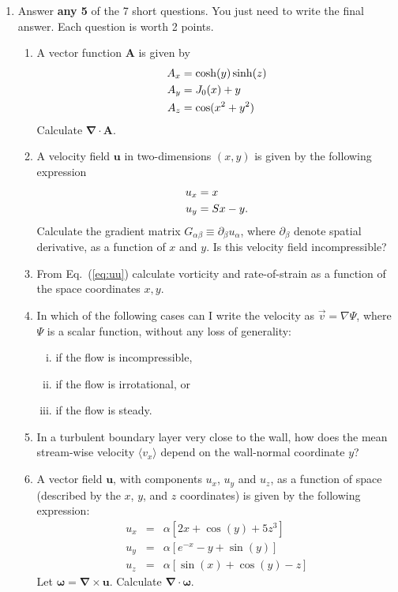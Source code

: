 \documentclass[12pt,a4paper]{article}
\def \AA  {\bm{A}}
\def \oo {\bm{\omega}}
\def \curl {\bm{\nabla}\times}
\def \dive {\bm{\nabla}\cdot}
\def \AA  {\bm{A}}
\newcommand{\bu}{\bm{u}}
\begin{document}
\begin{enumerate}
\item
\label{prb3}
Answer \textbf{any 5} of the  7 short questions.
You just need to write the final answer.
Each question is worth 2 points. 
\begin{enumerate}
\item A vector function $\AA$ is given by
  \begin{subequations}
    \begin{align}
      A_x &= \cosh(y)\sinh(z) \\
      A_y &= J_{\rm 0}(x) + y \\
      A_z &= \cos(x^2+y^2)
    \end{align}
  \end{subequations}
  Calculate $\bm{\nabla}\cdot\AA$.
 \item A velocity field $\bu$ in two-dimensions $(x,y)$ is given by the following expression
   \begin{subequations}
     \begin{align}
     u_x &= x \\
     u_y &= Sx -y   \/.
     \end{align}
     \label{eq:uu}
   \end{subequations}
   Calculate the gradient matrix $ G_{\alpha\beta} \equiv \partial_{\beta}u_{\alpha}$, where
   $\partial_{\beta}$ denote spatial derivative, as a function of $x$ and $y$. Is this velocity
   field incompressible?
 \item From Eq.~(\ref{eq:uu})  calculate vorticity and rate-of-strain as a function of the
   space coordinates $x,y$.

  \item In which of the following cases can I write the velocity as $\vec{v} = \nabla \Psi$, 
  where $\Psi$ is a scalar function, without any loss of generality:
    \begin{enumerate}[(i)]
    \item  if the flow is incompressible,
    \item if the flow is irrotational, or
    \item if the flow is steady.
    \end{enumerate}
  \item In a turbulent boundary layer very close to the wall, how does the mean stream-wise
    velocity $\langle v_x \rangle$ depend on the wall-normal coordinate $y$? 

\item A vector field $\bu$, with components $u_x$, $u_y$ and $u_z$,  as a function  of
    space (described by the $x$, $y$, and $z$ coordinates)
    is given by the following expression:
    \begin{eqnarray}
      u_x &=& \alpha [2x + \cos(y) + 5z^3 ] \nonumber \\
      u_y &=& \alpha[ e^{-x} - y + \sin(y) ] \nonumber \\
      u_z &=& \alpha[ \sin(x) + \cos(y) -z ]
    \end{eqnarray}
   Let $\oo = \curl \bu$. Calculate $\dive \oo$.


\end{enumerate}
\end{enumerate}
\end{document}
